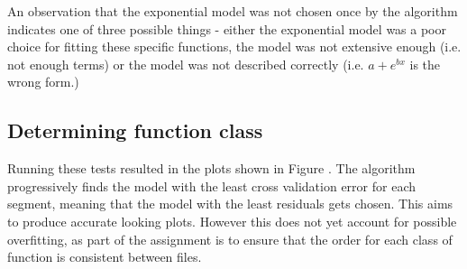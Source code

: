 \documentclass{article}
\begin{document}
An observation that the exponential model was not chosen once by the algorithm indicates one of three possible things - either the exponential model was a poor choice for fitting these specific functions, the model was not extensive enough (i.e. not enough terms) or the model was not described correctly (i.e. $a + e^{bx}$ is the wrong form.)

\subsection{Determining function class}

Running these tests resulted in the plots shown in Figure \pageref{fig:unaccounted}. The algorithm progressively finds the model with the least cross validation error for each segment, meaning that the model with the least residuals gets chosen. This aims to produce accurate looking plots. However this does not yet account for possible overfitting, as part of the assignment is to ensure that the order for each class of function is consistent between files.
\end{document}
